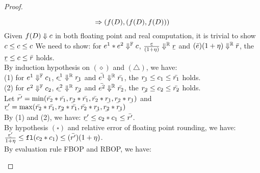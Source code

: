 \documentclass[a4paper,11pt]{article}
\begin{document}
\begin{proof}
\begin{itemize}
\begin{itemize}
{\[{			\trsto
			(f(D), ( f(D), f(D) ))
		}%
		\]
	}
	Given $f(D) \Downarrow c$ in both floating point and real computation, it is trivial to show $c \leq c \leq c$
	\subcaseL{
	\[
	\inferrule*[right = bop]
		{
			\trsenv, \expr^1 \trsto 
			(\expr, (\ubar{\expr^1}, \bar{\expr^1})) ~ (\diamond)
			\and
			\trsenv, \expr^2 \trsto 
			(\expr, (\ubar{\expr^2}, \bar{\expr^2})) ~ (\triangle)
			\\
		\bar{\expr}, \ubar{\expr} = 
		\max, \min(\ubar{\expr^1} * \ubar{\expr^2}, 
		\bar{\expr^1} * \ubar{\expr^2}, 
		\ubar{\expr^1} * \bar{\expr^2}, 
		\bar{\expr^1} * \bar{\expr^2})
			\and
			\expr^1 * \expr^2 \geq 0 ~ (\square)
		}
		{
		    \trsenv, \expr^1 * \expr^2
		    \trsto
		    \big(
		    \expr^1 * \expr^2,
		    (\frac{\ubar{\expr}}{(1 + \eta)}, 
		        (\bar{\expr})(1 + \eta))
		    \big)
		}
	\]
	}
	We need to show: for $e^1 * e^2 \Downarrow^{\mathbb{F}} c$, 
	$\frac{\ubar{\expr}}{(1 + \eta)} \rbigstep \ubar{\rval}$ 
	and $(\bar{e})(1 + \eta) \Downarrow^{\mathbb{R}} \bar{r}$, the $\ubar{\rval} \leq \fval \leq \bar{\rval}$ holds.\\
	By induction hypothesis on $(\diamond)$ and $(\triangle)$, we have:\\
	(1) for $e^1 \Downarrow^{\mathbb{F}} c_1$, 
	$\ubar{\expr^1} \rbigstep \ubar{\rval_1}$ 
	and $\bar{e^1} \Downarrow^{\mathbb{R}} \bar{r_1}$,
	the $\ubar{\rval_1} \leq \fval_1 \leq \bar{\rval_1}$ holds.\\
	(2) for $e^2 \Downarrow^{\mathbb{F}} c_2$, 
	$\ubar{\expr^2} \rbigstep \ubar{\rval_2}$ 
	and $\bar{e^2} \Downarrow^{\mathbb{R}} \bar{r_2}$,
	the $\ubar{\rval_2} \leq \fval_2 \leq \bar{\rval_2}$ holds.\\
	Let $\bar{\rval'} = 
	\min(\bar{\rval_2} \bop \bar{\rval_1}, 
	\ubar{\rval_2} \bop \bar{\rval_1},
	\bar{\rval_2} \bop \ubar{\rval_1},
	\ubar{\rval_2} \bop \ubar{\rval_1})$ and 
	$\ubar{\rval'} = 
	\max(\bar{\rval_2} \bop \bar{\rval_1}, 
	\ubar{\rval_2} \bop \bar{\rval_1},
	\bar{\rval_2} \bop \ubar{\rval_1},
	\ubar{\rval_2} \bop \ubar{\rval_1})
	$\\
	By (1) and (2), we have:
	$\ubar{\rval'}
	\leq \fval_2 \bop \fval_1
	\leq \bar{\rval'}$.\\
	By hypothesis $(\square)$ and relative error of floating point rounding, we have:\\
	$\frac{\ubar{\rval'}}{1 + \eta}
	\leq \floaten(\fval_2 \bop \fval_1)
	\leq (\bar{\rval'})(1 + \eta)$.\\
	By evaluation rule FBOP and RBOP, we have:\\

\end{itemize}
\end{itemize}
\end{proof}
\end{document}
